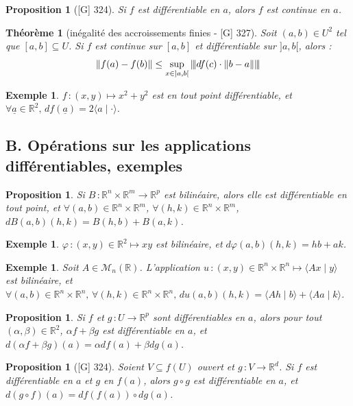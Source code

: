 \documentclass[10pt, a4paper, parskip=full, twoside, twocolumn]{report}
\newtheorem{theorem}[definition]{Théorème}
\newtheorem{proposition}[definition]{Proposition}
\newtheorem{example}[definition]{Exemple}
\newcommand{\IR}{\mathbb{R}}
\newcommand{\M}{\mathcal{M}}
\newcommand{\ps}[2]{\langle #1\mid #2\rangle}
\newcommand{\vertiii}[1]{{\left\vert\kern-0.25ex\left\vert\kern-0.25ex\left\vert #1 
    \right\vert\kern-0.25ex\right\vert\kern-0.25ex\right\vert}}
\begin{document}
\begin{proposition}[\textnormal{[G] 324}]
	Si $f$ est différentiable en $a$, alors $f$ est continue en $a$.
\end{proposition}

\begin{theorem}[inégalité des accroissements finies - \textnormal{[G] 327}]
	Soit $(a,b)\in U^2$ tel que $[a,b]\subseteq U$. Si $f$ est continue sur $[a,b]$ et différentiable sur $]a,b[$, alors :
	$$\|f(a)-f(b)\|\leq \sup_{x\in ]a,b[} \vertiii{df(c)\cdot \|b-a\|}$$
\end{theorem}

\begin{example}
	$f\,\colon (x,y)\mapsto x^2 + y^2$ est en tout point différentiable, et $\forall \underline{a}\in\IR^2,\, df(\underline{a}) = 2\ps{a}{\cdot}$.
\end{example}

\subsection*{B. Opérations sur les applications différentiables, exemples}

\begin{proposition}
	Si $B\,\colon \IR^n\times\IR^m\to\IR^p$ est bilinéaire, alors elle est différentiable en tout point, et $\forall(a,b)\in\IR^n\times\IR^m$, $\forall (h,k)\in\IR^n\times\IR^m$, $dB(a,b)(h,k) = B(h,b) + B(a,k)$.
\end{proposition}

\begin{example}
	$\varphi\,\colon (x,y)\in \IR^2 \mapsto xy$ est bilinéaire, et $d\varphi(a,b)(h,k) = hb+ak$.
\end{example}

\begin{example}
	Soit $A\in\M_n(\IR)$. L'application $u\,\colon (x,y)\in\IR^n\times\IR^n\mapsto \ps{Ax}{y}$ est bilinéaire, et $\forall(a,b)\in\IR^n\times\IR^n,\, \forall (h,k)\in\IR^n\times\IR^n,\, du(a,b)(h,k) = \ps{Ah}{b} + \ps{Aa}{k}$.
\end{example}

\begin{proposition}
	Si $f$ et $g\,\colon U\to \IR^p$ sont différentiables en $a$, alors pour tout $(\alpha, \beta)\in\IR^2$, $\alpha f + \beta g$ est différentiable en $a$, et $d(\alpha f + \beta g)(a) = \alpha df(a) + \beta dg(a)$.
\end{proposition}

\begin{proposition}[\textnormal{[G] 324}]
	Soient $V\subseteq f(U)$ ouvert et $g\,\colon V\to \IR^d$. Si $f$ est différentiable en $a$ et $g$ en $f(a)$, alors $g\circ g$ est différentiable en $a$, et $d(g\circ f)(a) = df(f(a))\circ dg(a)$.
\end{proposition}
\end{document}
